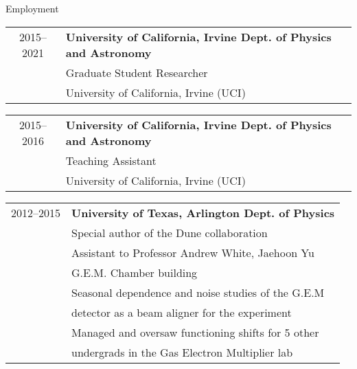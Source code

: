 
\vspace{0.35in}
{\Large Employment}\\
\HRule
\vspace{0.25in}

\hspace{0.18in}
\begin{tabular}{c|l}
     2015--2021 & {\bf{University of California, Irvine Dept. of Physics and Astronomy}} \\
              & Graduate Student Researcher \\
              & University of California, Irvine (UCI) %
\end{tabular}

\vspace{0.1in}
\hspace{0.18in}
\begin{tabular}{c|l}
    2015--2016 & {\bf{University of California, Irvine Dept. of Physics and Astronomy}} \\
              & Teaching Assistant \\
              & University of California, Irvine (UCI) %
\end{tabular}


\vspace{0.1in}
\hspace{0.18in}
\begin{tabular}{c|l}
    2012--2015 & {\bf{University of Texas, Arlington Dept. of Physics}} \\
              & Special author of the Dune collaboration\\
              & Assistant to Professor Andrew White, Jaehoon Yu \\
              & G.E.M. Chamber building \\
              & Seasonal dependence and noise studies of the G.E.M \\
              & detector as a beam aligner for the experiment \\
              & Managed and oversaw functioning shifts for 5 other\\
              & undergrads in the Gas Electron Multiplier lab 
\end{tabular}

